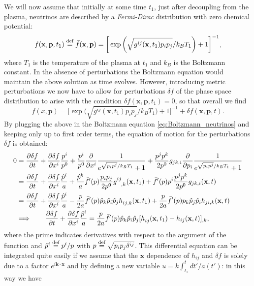 We will now assume that initially at some time $t_1$, just after decoupling from the plasma, neutrinos are described by a \emph{Fermi-Dirac} distribution with zero chemical potential:
$$f(\mathbf{x},\mathbf{p},t_1)\stackrel{\text{def}}{=}\bar f(\mathbf{x},\mathbf{p})=\bigg[\exp\bigg(\sqrt{g^{ij}(\mathbf x,t_1)p_ip_j}/k_B T_1\bigg)+1\bigg]^{-1},$$
where $T_1$ is the temperature of the plasma at $t_1$ and $k_B$ is the Boltzmann constant. In the absence of perturbations the Boltzmann equation would maintain the above solution as time evolves. However, introducing metric perturbations we now have to allow for perturbations $\delta f$ of the phase space distribution to arise with the condition $\delta f(\mathbf x,\mathbf p, t_1)=0$, so that overall we find
$$f(x,\mathbf p)=\bigg[\exp\bigg(\sqrt{g^{ij}(\mathbf x,t_1)p_ip_j}/k_B T_1\bigg)+1\bigg]^{-1}+\delta f(\mathbf{x},\mathbf{p},t).$$
By plugging the above in the Boltzmann equation \eqref{eq:Boltzmann_neutrinos} and keeping only up to first order terms, the equation of motion for the perturbations $\delta f$ is obtained:
\begin{align*}
   0&=\frac{\partial \delta f}{\partial t}+\frac{\partial \delta f}{\partial x^i}\frac{p^i}{p^0}+\frac{p^i}{p^0}\frac{\partial }{\partial x^i}\frac{1}{e^{\sqrt{p_ip^j}/k_BT_1}+1}+\frac{p^jp^k}{2p^0}g_{jk,i}\frac{\partial }{\partial p_i}\frac{1}{e^{\sqrt{p_ip^j}/k_BT_1}+1}\\&= \frac{\partial \delta f}{\partial t}+\frac{\partial \delta f}{\partial x^i}\frac{\hat p^i}{a}+\frac{\hat p^k}{a}\bar f'(p)\frac{p_ip_j}{2p^0}\tensor{g}{^i^j_,_k}(\mathbf{x},t_1)+\bar f'(p)p^i\frac{p^jp^k}{2p^0}g_{jk,i}(\mathbf x, t) \\&= \frac{\partial \delta f}{\partial t}+\frac{\partial \delta f}{\partial x^i}\frac{\hat p^i}{a}-\frac{p}{2a}\bar f'(p)\hat p_k\hat p_i\hat p_j\tensor{h}{_i_j_,_k}(\mathbf{x},t_1)+\frac{p}{2a}\bar f'(p)p_k\hat p_j\hat p_ih_{ji,k}(\mathbf x, t)\\
   &\Longrightarrow\qquad \frac{\partial \delta f}{\partial t}+\frac{\partial \delta f}{\partial x^i}\frac{\hat p^i}{a}=\frac{p}{2a}\bar f'(p)\hat p_k\hat p_i\hat p_j[\tensor{h}{_i_j}(\mathbf{x},t_1)-h_{ij}(\mathbf x, t)]_{,k},
\end{align*}
where the prime indicates derivatives with respect to the argument of the function and $\hat p^i\stackrel{\text{def}}{=} p^i/p$ with $p\stackrel{\text{def}}{=}{\sqrt{p_ip_j\delta^{ij}}}$. This differential equation can be integrated quite easily if we assume that the $\mathbf x$ dependence of $h_{ij}$ and $\delta f$ is solely due to a factor $e^{i\mathbf{k\cdot x}}$ and by defining a new variable $u= k\int_{t_1}^{t}dt'/a(t')$: in this way we have
